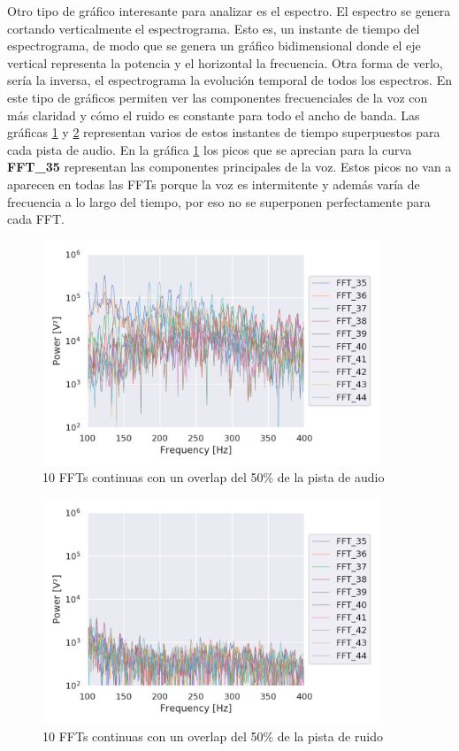 Otro tipo de gráfico interesante para analizar es el espectro. El espectro se genera cortando verticalmente el espectrograma. Esto es, un instante de tiempo del espectrograma, de modo que se genera un gráfico bidimensional donde el eje vertical representa la potencia y el horizontal la frecuencia. Otra forma de verlo, sería la inversa, el espectrograma la evolución temporal de todos los espectros. En este tipo de gráficos permiten ver las componentes frecuenciales de la voz con más claridad y cómo el ruido es constante para todo el ancho de banda. Las gráficas \ref{fig: ffts_audio} y \ref{fig: ffts_noise} representan varios de estos instantes de tiempo superpuestos para cada pista de audio. En la gráfica \ref{fig: ffts_audio} los picos que se aprecian para la curva \textbf{FFT\_35} representan las componentes principales de la voz. Estos picos no van a aparecen en todas las \glspl{FFT} porque la voz es intermitente y además varía de frecuencia a lo largo del tiempo, por eso no se superponen perfectamente para cada \gls{FFT}.

\begin{figure}[h!]
	\centering
	\includegraphics[width=0.9\textwidth]{figures/audio_ffts}
	\caption{10 \acrshort{FFT}s continuas con un overlap del 50\% de la pista de audio}
	\label{fig: ffts_audio}
\end{figure}
\begin{figure}[h!]
	\centering
	\includegraphics[width=0.9\textwidth]{figures/noise_ffts}
	\caption{10 \acrshort{FFT}s continuas con un overlap del 50\% de la pista de ruido}
	\label{fig: ffts_noise}
\end{figure}

